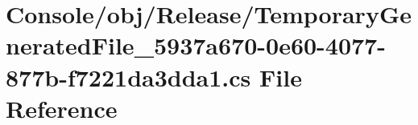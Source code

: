 \hypertarget{_console_2obj_2_release_2_temporary_generated_file__5937a670-0e60-4077-877b-f7221da3dda1_8cs}{}\section{Console/obj/\+Release/\+Temporary\+Generated\+File\+\_\+5937a670-\/0e60-\/4077-\/877b-\/f7221da3dda1.cs File Reference}
\label{_console_2obj_2_release_2_temporary_generated_file__5937a670-0e60-4077-877b-f7221da3dda1_8cs}
